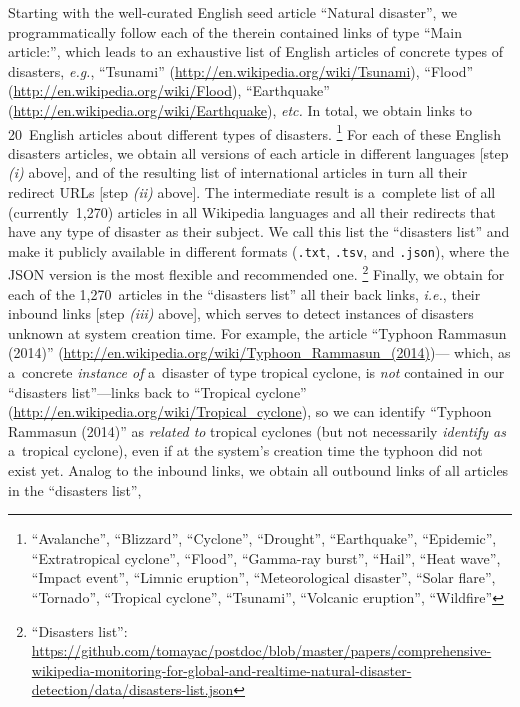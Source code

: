 \documentclass[letterpaper]{article}
\begin{document}
Starting with the well-curated English seed article ``Natural disaster'',
we programmatically follow each of the therein contained links of type ``Main article:'',
which leads to an exhaustive list of English articles
of concrete types of disasters,
\emph{e.g.}, ``Tsunami'' (\url{http://en.wikipedia.org/wiki/Tsunami}),
``Flood'' (\url{http://en.wikipedia.org/wiki/Flood}),
``Earthquake'' (\url{http://en.wikipedia.org/wiki/Earthquake}),
\emph{etc.} In total, we obtain links to 20~English articles
about different types of disasters.%
\footnote{``Avalanche'', ``Blizzard'', ``Cyclone'', ``Drought'', ``Earthquake'',
``Epidemic'', ``Extratropical cyclone'', ``Flood'', ``Gamma-ray burst'', ``Hail'',
``Heat wave'', ``Impact event'', ``Limnic eruption'', ``Meteorological disaster'',
``Solar flare'', ``Tornado'', ``Tropical cyclone'', ``Tsunami'',
``Volcanic eruption'', ``Wildfire''}
For each of these English disasters articles,
we obtain all versions of each article in different languages
[step \emph{(i)} above],
and of the resulting list of international articles
in turn all their redirect URLs [step \emph{(ii)} above].
The intermediate result is a~complete list of all (currently~1,270) articles
in all Wikipedia languages and all their redirects
that have any type of disaster as their subject.
We call this list the ``disasters list''
and make it publicly available in different formats
(\texttt{.txt}, \texttt{.tsv}, and \texttt{.json}), where the JSON version
is the most flexible and recommended one.%
\footnote{``Disasters list'':
\url{https://github.com/tomayac/postdoc/blob/master/papers/comprehensive-wikipedia-monitoring-for-global-and-realtime-natural-disaster-detection/data/disasters-list.json}}
Finally, we obtain for each of the 1,270~articles
in the ``disasters list''
all their back links, \emph{i.e.}, their inbound links
[step \emph{(iii)} above], which serves to detect
instances of disasters unknown at system creation time.
For example, the article ``Typhoon Rammasun (2014)''
(\url{http://en.wikipedia.org/wiki/Typhoon_Rammasun_(2014)})---%
which, as a~concrete \emph{instance of} a~disaster
of type tropical cyclone, is \emph{not} contained in our
``disasters list''---links back to ``Tropical cyclone''
(\url{http://en.wikipedia.org/wiki/Tropical_cyclone}),
so we can identify ``Typhoon Rammasun (2014)'' as \emph{related to}
tropical cyclones (but not necessarily \emph{identify as} a~tropical cyclone),
even if at the system's creation time the typhoon did not exist yet.
Analog to the inbound links, we obtain all
outbound links of all articles in the ``disasters list'',
\end{document}
